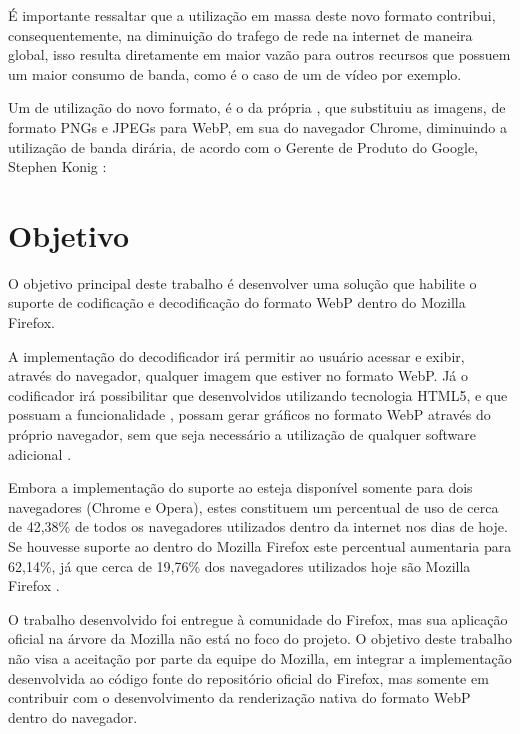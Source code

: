 \documentclass[espaco=simples,appendix=Name]{abnt}
\begin{document}
É importante ressaltar que a utilização em massa deste novo formato contribui, consequentemente, na diminuição do trafego de rede na internet de maneira global, isso resulta diretamente em maior vazão para outros recursos que possuem um maior consumo de banda, como é o caso de um  de vídeo por exemplo.

\newpage
Um  de utilização do novo formato, é o da própria , que substituiu as imagens, de formato PNGs e JPEGs para WebP, em sua  do navegador Chrome, diminuindo a utilização de banda dirária, de acordo com o Gerente de Produto do Google, Stephen Konig \cite{ChromiumBlog}:
\begin{citacao}
\end{citacao}

\section{Objetivo}

O objetivo principal deste trabalho é desenvolver uma solução que habilite o suporte de codificação e decodificação do formato WebP dentro do Mozilla Firefox. 

A implementação do decodificador irá permitir ao usuário acessar e exibir, através do navegador, qualquer imagem que estiver no formato WebP. Já o codificador irá possibilitar que  desenvolvidos utilizando tecnologia HTML5, e que possuam a funcionalidade , possam gerar gráficos no formato WebP através do próprio navegador, sem que seja necessário a utilização de qualquer software adicional \cite{pfeiffer2010definitive}.

Embora a implementação do suporte ao  esteja disponível somente para dois navegadores (Chrome e Opera), estes constituem um percentual de uso de cerca de 42,38\% de todos os navegadores utilizados dentro da internet nos dias de hoje. Se houvesse suporte ao  dentro do Mozilla Firefox este percentual aumentaria para 62,14\%, já que cerca de 19,76\% dos navegadores utilizados hoje são Mozilla Firefox \cite{BrowserStats}.

O trabalho desenvolvido foi entregue à comunidade do Firefox, mas sua aplicação oficial na árvore da Mozilla não está no foco do projeto. O objetivo deste trabalho não visa a aceitação por parte da equipe do Mozilla, em integrar a implementação desenvolvida ao código fonte do repositório oficial do Firefox, mas somente em contribuir com o desenvolvimento da renderização nativa do formato WebP dentro do navegador.
\end{document}
